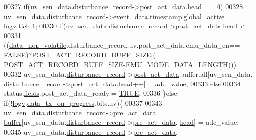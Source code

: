 \begin{DoxyCode}
00327         \textcolor{keywordflow}{if}(uv\_sen\_data.\hyperlink{a00035_ac9b38e2c1d3f1013a88d33506c754152}{disturbance\_record}->\hyperlink{a00028_a9c699c0cc82d0baa6e49195f185ab34f}{post\_act\_data}.head == 0)
00328             uv\_sen\_data.\hyperlink{a00035_ac9b38e2c1d3f1013a88d33506c754152}{disturbance\_record}->\hyperlink{a00028_a8c0bda69e71ef674e60da47ad0be9ab0}{event\_data}.timestamp.global\_active 
      = \hyperlink{a00021_a2e89c46668b39a17753c238950c9e1ec}{logv}.\hyperlink{a00021_a81f0ce68c2c483fb8df726cc1988d8e8}{tick}-1;
00330       \textcolor{keywordflow}{if}(uv\_sen\_data.\hyperlink{a00035_ac9b38e2c1d3f1013a88d33506c754152}{disturbance\_record}->\hyperlink{a00028_a9c699c0cc82d0baa6e49195f185ab34f}{post\_act\_data}.head <
00331         ((\hyperlink{a00060_a76ac5f917f5308dcd83de0d7c94559fb}{data\_non\_volatile}.disturbance\_record.uv.post\_act\_data.emu\_data\_en==
      \hyperlink{a00040_aa93f0eb578d23995850d61f7d61c55c1}{FALSE})?\hyperlink{a00022_ab1ad440de86fff80e517ad748de2ee39}{POST\_ACT\_RECORD\_BUFF\_SIZE}:(
      \hyperlink{a00022_ab1ad440de86fff80e517ad748de2ee39}{POST\_ACT\_RECORD\_BUFF\_SIZE}-\hyperlink{a00022_af4c3a8ad94feb4d7bda7f107f34baf41}{EMU\_MODE\_DATA\_LENGTH})))
00332       uv\_sen\_data.\hyperlink{a00035_ac9b38e2c1d3f1013a88d33506c754152}{disturbance\_record}->\hyperlink{a00028_a9c699c0cc82d0baa6e49195f185ab34f}{post\_act\_data}.buffer.all[uv\_sen\_data.
      \hyperlink{a00035_ac9b38e2c1d3f1013a88d33506c754152}{disturbance\_record}->\hyperlink{a00028_a9c699c0cc82d0baa6e49195f185ab34f}{post\_act\_data}.head++] = adc\_value;
00333       \textcolor{keywordflow}{else}
00334       status.\hyperlink{a00021_a5296d090c085b0421fdf5a86e382abea}{fields}.post\_act\_data\_ready = \hyperlink{a00040_aa8cecfc5c5c054d2875c03e77b7be15d}{TRUE};
00336     \}\textcolor{keywordflow}{else} \textcolor{keywordflow}{if}(!\hyperlink{a00021_a2e89c46668b39a17753c238950c9e1ec}{logv}.\hyperlink{a00021_a6cdefde69642ef511e3252c38be68516}{data\_tx\_on\_progress}.bits.uv)\{
00337 
00343     uv\_sen\_data.\hyperlink{a00035_ac9b38e2c1d3f1013a88d33506c754152}{disturbance\_record}->\hyperlink{a00028_aab01e8da056827bc5c9caff9b64c78be}{pre\_act\_data}.
      \hyperlink{a00022_ad611012074e252bf84c1cfb8c273dd79}{buffer}[uv\_sen\_data.\hyperlink{a00035_ac9b38e2c1d3f1013a88d33506c754152}{disturbance\_record}->\hyperlink{a00028_aab01e8da056827bc5c9caff9b64c78be}{pre\_act\_data}.
      \hyperlink{a00022_a15a6827ccabba1c22396eccc1c5c654b}{head}] = adc\_value;
00345     uv\_sen\_data.\hyperlink{a00035_ac9b38e2c1d3f1013a88d33506c754152}{disturbance\_record}->\hyperlink{a00028_aab01e8da056827bc5c9caff9b64c78be}{pre\_act\_data}.

\end{DoxyCode}

